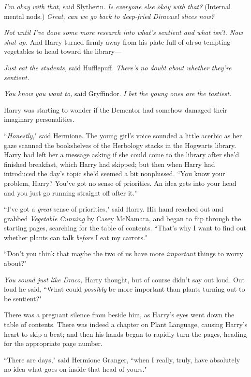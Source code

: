 \emph{I'm okay with that,} said Slytherin. \emph{Is everyone else okay with that?} (Internal mental nods.) \emph{Great, can we go back to deep-fried Diracawl slices now?}

\emph{Not until I've done some more research into what's sentient and what isn't. Now shut up.} And Harry turned firmly away from his plate full of oh-so-tempting vegetables to head toward the library---

\emph{Just eat the students,} said Hufflepuff. \emph{There's no doubt about whether \emph{they're} sentient.}

\emph{You know you want to,} said Gryffindor. \emph{I bet the young ones are the tastiest.}

Harry was starting to wonder if the Dementor had somehow damaged their imaginary personalities.

\later

``\emph{Honestly}," said Hermione. The young girl's voice sounded a little acerbic as her gaze scanned the bookshelves of the Herbology stacks in the Hogwarts library. Harry had left her a message asking if she could come to the library after she'd finished breakfast, which Harry had skipped; but then when Harry had introduced the day's topic she'd seemed a bit nonplussed. ``You know your problem, Harry? You've got no sense of priorities. An idea gets into your head and you just go running straight off after it."

``I've got a \emph{great} sense of priorities," said Harry. His hand reached out and grabbed \emph{Vegetable Cunning} by Casey McNamara, and began to flip through the starting pages, searching for the table of contents. ``That's why I want to find out whether plants can talk \emph{before} I eat my carrots."

``Don't you think that maybe the two of us have more \emph{important} things to worry about?"

\emph{You sound just like Draco,} Harry thought, but of course didn't say out loud. Out loud he said, ``What could \emph{possibly} be more important than plants turning out to be sentient?"

There was a pregnant silence from beside him, as Harry's eyes went down the table of contents. There was indeed a chapter on Plant Language, causing Harry's heart to skip a beat; and then his hands began to rapidly turn the pages, heading for the appropriate page number.

``There are days," said Hermione Granger, ``when I really, truly, have absolutely no idea what goes on inside that head of yours."

